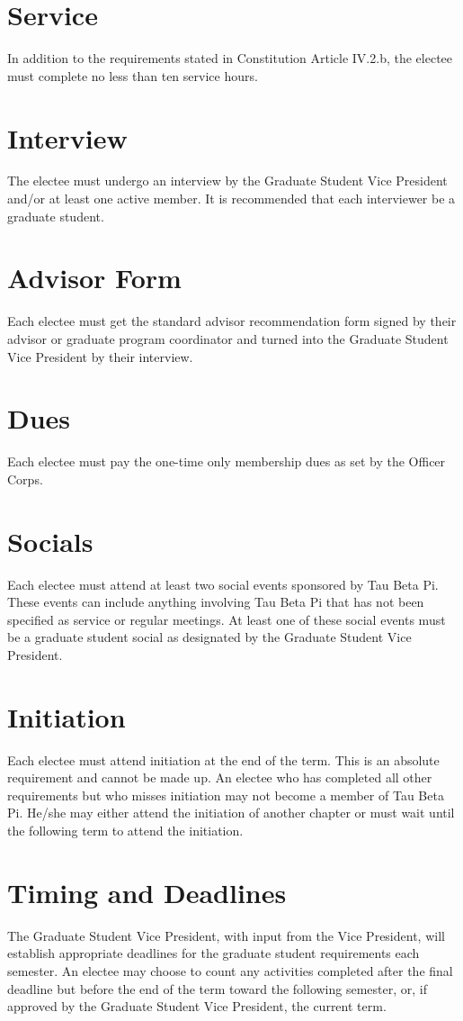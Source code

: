 \section{Service}	In addition to the requirements stated in Constitution Article IV.2.b, the electee must complete no less than ten service hours. 
\section{Interview}	The electee must undergo an interview by the Graduate Student Vice President and/or at least one active member. It is recommended that each interviewer be a graduate student. 
\section{Advisor Form}	Each electee must get the standard advisor recommendation form signed by their advisor or graduate program coordinator and turned into the Graduate Student Vice President by their interview.
\section{Dues}	Each electee must pay the one-time only membership dues as set by the Officer Corps. 
\section{Socials}	Each electee must attend at least two social events sponsored by Tau Beta Pi. These events can include anything involving Tau Beta Pi that has not been specified as service or regular meetings.  At least one of these social events must be a graduate student social as designated by the Graduate Student Vice President.
\section{Initiation}	Each electee must attend initiation at the end of the term. This is an absolute requirement and cannot be made up. An electee who has completed all other requirements but who misses initiation may not become a member of Tau Beta Pi. He/she may either attend the initiation of another chapter or must wait until the following term to attend the initiation.  
\section{Timing and Deadlines}  The Graduate Student Vice President, with input from the Vice President, will establish appropriate deadlines for the graduate student requirements each semester. An electee may choose to count any activities completed after the final deadline but before the end of the term toward the following semester, or, if approved by the Graduate Student Vice President, the current term.


